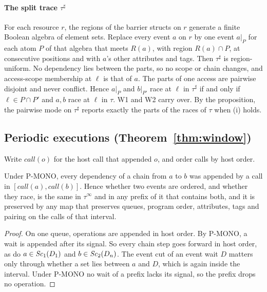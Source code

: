 \paragraph{The split trace $\tau^\sharp$}
For each resource $r$, the regions of the barrier structs on $r$ generate a finite Boolean algebra of element sets.
Replace every event $a$ on $r$ by one event $a|_P$ for each atom $P$ of that algebra that meets $R(a)$, with region $R(a)
\cap P$, at consecutive positions and with $a$'s other attributes and tags. Then $\tau^\sharp$ is region-uniform. No
dependency lies between the parts, so no scope or chain changes, and access-scope membership at $\ell$ is that of $a$.
The parts of one access are pairwise disjoint and never conflict. Hence $a|_P$ and $b|_{P'}$ race at $\ell$ in
$\tau^\sharp$ if and only if $\ell \in P \cap P'$ and $a, b$ race at $\ell$ in $\tau$. W1 and W2 carry over.
By the proposition, the pairwise mode on $\tau^\sharp$ reports exactly the parts of the races of $\tau$ when (i) holds.

\subsection{Periodic executions (Theorem~\ref{thm:window})}
\label{app:window}

Write $\mathit{call}(o)$ for the host call that appended $o$, and order calls by host order.

\begin{lemma}[Locality, W.1]\label{lem:loc}
Under P-MONO, every dependency of a chain from $a$ to $b$ was appended by a call in $[\mathit{call}(a),
\mathit{call}(b)]$. Hence whether two events are ordered, and whether they race, is the same in $\tau^\infty$ and in
any prefix of it that contains both, and it is preserved by any map that preserves queues, program order,
attributes, tags and pairing on the calls of that interval.
\end{lemma}
\begin{proof}
On one queue, operations are appended in host order. By P-MONO, a wait is appended after its signal. So every chain
step goes forward in host order, as do $a \in \mathit{Sc}_{1}(D_1)$ and $b \in \mathit{Sc}_{2}(D_n)$. The event cut of an event wait
$D$ matters only through whether a set lies between $a$ and $D$, which is again inside the interval. Under P-MONO no
wait of a prefix lacks its signal, so the prefix drops no operation.
\end{proof}

